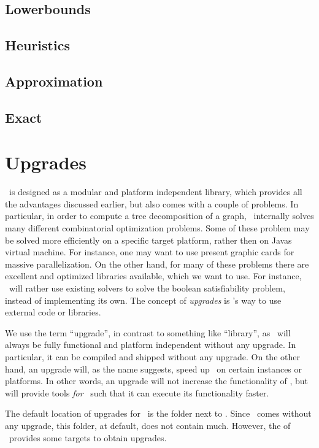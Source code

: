 \documentclass[a4paper, ukenglish, twoside, openright]{jdrasilmanual}
\begin{document}
\chapter{Lowerbounds}

\chapter{Heuristics}

\chapter{Approximation}

\chapter{Exact}

\part{Upgrades}

\Jdrasil\ is designed as a modular and platform independent library,
which provides all the advantages discussed earlier, but also comes
with a couple of problems. In particular, in order to compute a tree
decomposition of a graph, \Jdrasil\ internally solves many different
combinatorial optimization problems. Some of these problem may be
solved more efficiently on a specific target platform, rather then on
Javas virtual machine. For instance, one may want to use present
graphic cards for massive parallelization. On the other hand, for many
of these problems there are excellent and optimized libraries
available, which we want to use. For instance, \Jdrasil\ will rather
use existing  solvers to solve the boolean satisfiability
problem, instead of implementing its own. The concept of
\emph{upgrades} is \Jdrasil's way to use external code or
libraries. 

We use the term ``upgrade'', in contrast to something like
``library'', as \Jdrasil\ will always be fully functional and platform
independent without any upgrade. In particular, it can be compiled and
shipped without any upgrade. On the other hand, an upgrade will, as
the name suggests, speed up \Jdrasil\ on certain instances or
platforms. In other words, an upgrade will not increase the
functionality of \Jdrasil, but will provide tools \emph{for} \Jdrasil\
such that it can execute its functionality faster.

The default location of upgrades for \Jdrasil\ is the folder
 next to . Since \Jdrasil\ comes
without any upgrade, this folder, at default, does not contain
much. However, the  of \Jdrasil\ provides some targets
to obtain upgrades.
\end{document}
